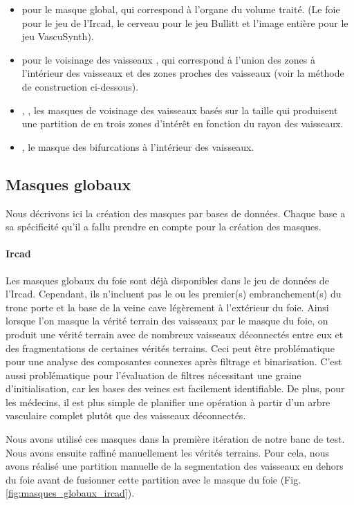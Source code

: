 \begin{itemize}
  \item \maskglobal pour le masque global, qui correspond à l'organe du volume traité. (Le foie pour le jeu de l'Ircad, le cerveau pour le jeu Bullitt et l'image entière pour le jeu VascuSynth).
  \item \maskvascular pour le voisinage des vaisseaux , qui correspond à l'union des zones à l'intérieur des vaisseaux et des zones proches des vaisseaux (voir la méthode de construction ci-dessous).
  \item \maskvesselLarge, \maskvesselMedium, \maskvesselSmall les masques de voisinage des vaisseaux basés sur la taille  qui produisent une partition de \maskvascular en trois zones d'intérêt en fonction du rayon des vaisseaux.
  \item \maskbif, le masque des bifurcations à l'intérieur des vaisseaux.
  \end{itemize}

\subsection{Masques globaux}

Nous décrivons ici la création des masques par bases de données. Chaque base a sa spécificité qu'il a fallu prendre en compte pour la création des masques.

\paragraph{Ircad}
Les masques globaux du foie sont déjà disponibles dans le jeu de données de l'Ircad. Cependant, ils n'incluent pas le ou les premier(s) embranchement(s) du tronc porte et la base de la veine cave légèrement à l'extérieur du foie. Ainsi lorsque l'on masque la vérité terrain des vaisseaux par le masque du foie, on produit une vérité terrain avec de nombreux vaisseaux déconnectés entre eux et des fragmentations de certaines vérités terrains. Ceci peut être problématique pour une analyse des composantes connexes après filtrage et binarisation. C'est aussi problématique pour l'évaluation de filtres nécessitant une graine d'initialisation, car les bases des veines est facilement identifiable. De plus, pour les médecins, il est plus simple de planifier une opération à partir d'un arbre vasculaire complet plutôt que des vaisseaux déconnectés.

Nous avons utilisé ces masques dans la première itération de notre banc de test. Nous avons ensuite raffiné manuellement les vérités terrains. Pour cela, nous avons réalisé une partition manuelle de la segmentation des vaisseaux en dehors du foie avant de fusionner cette partition avec le masque du foie (Fig. \ref{fig:masques_globaux_ircad}).

